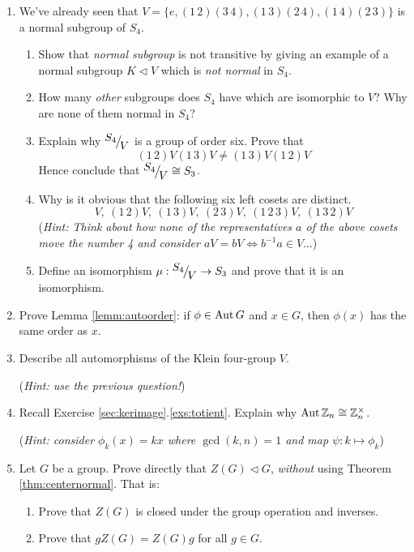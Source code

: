 \begin{exercises}{}{}
\begin{enumerate}
  
	\item We've already seen that $V=\{e,(1\,2)(3\,4),(1\,3)(2\,4),(1\,4)(2\,3)\}$ is a normal subgroup of $S_4$.
	\begin{enumerate}
  	\item Show that \emph{normal subgroup} is not transitive by giving an example of a normal subgroup $K\triangleleft V$ which is \emph{not normal} in $S_4$.
  	
  	\item How many \emph{other} subgroups does $S_4$ have which are isomorphic to $V$? Why are none of them normal in $S_4$?
  	
		\item Explain why ${}^{\textstyle {S_4}}\!\big/_{\textstyle \!{V}}$ is a group of order six. Prove that
		\[(1\,2)V(1\,3)V\neq (1\,3)V(1\,2)V\]
		Hence conclude that ${}^{\textstyle {S_4}}\!\big/_{\textstyle \!{V}}\cong S_3$.
		
		\item Why is it obvious that the following six left cosets are distinct.
		\[V,\ (1\,2)V,\ (1\,3)V,\ (2\,3)V,\ (1\,2\,3)V,\ (1\,3\,2)V\]
		(\emph{Hint: Think about how none of the representatives $a$ of the above cosets move the number 4 and consider $aV=bV\iff b^{-1}a\in V\ldots$})
		
		\item Define an isomorphism $\mu:{}^{\textstyle {S_4}}\!\big/_{\textstyle \!{V}}\to S_3$ and prove that it is an isomorphism.
\end{enumerate}


	\item Prove Lemma \ref{lemm:autoorder}: if $\phi\in\operatorname{Aut} G$ and $x\in G$, then $\phi(x)$ has the same order as $x$.
  
  
  \item Describe all automorphisms of the Klein four-group $V$.\par
  (\emph{Hint: use the previous question!})
  
  
  \item Recall Exercise \ref*{sec:kerimage}.\ref{exs:totient}. Explain why $\operatorname{Aut}\mathbb{Z}_n\cong\mathbb{Z}_n^\times$.\par
  (\emph{Hint: consider $\phi_k(x)=kx$ where $\gcd(k,n)=1$ and map $\psi:k\mapsto\phi_k$})
  
  
  \item Let $G$ be a group. Prove directly that $Z(G)\triangleleft G$, \emph{without} using Theorem \ref{thm:centernormal}. That is:
	\begin{enumerate}
  	\item Prove that $Z(G)$ is closed under the group operation and inverses.
  	\item Prove that $gZ(G)=Z(G)g$ for all $g\in G$.
	\end{enumerate}
	

\end{enumerate}
\end{exercises}
